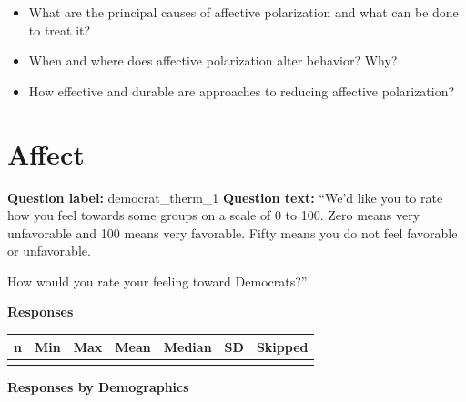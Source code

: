\documentclass[]{article}
\providecommand{\tightlist}{%
  \setlength{\itemsep}{0pt}\setlength{\parskip}{0pt}}
\begin{document}
\begin{itemize}
\tightlist
\item
  What are the principal causes of affective polarization and what can
  be done to treat it?
\item
  When and where does affective polarization alter behavior? Why?
\item
  How effective and durable are approaches to reducing affective
  polarization? \newpage
\end{itemize}

\hypertarget{affect}{%
\section{Affect}\label{affect}}

\begin{flushleft} \textbf{Question label:} democrat\_therm\_1 \break \break \textbf{Question text:} ``We'd like you to rate how you feel towards some groups on a scale of 0 to 100. Zero means very unfavorable and 100 means very favorable. Fifty means you do not feel favorable or unfavorable. 

How would you rate your feeling toward Democrats?'' \end{flushleft}

\textbf{Responses}

\begin{tabu} to 
\toprule
n & Min & Max & Mean & Median & SD & Skipped\\
\midrule
{} &  &  &  &  &  & \\
\bottomrule
\end{tabu}

\textbf{Responses by Demographics}\begingroup\fontsize{7}{9}\selectfont
\end{document}
